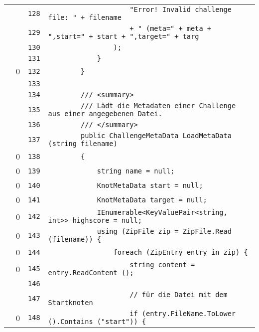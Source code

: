 \documentclass[a4paper,10pt]{article}
\begin{document}
\begin{longtable}[l]{lrrl}
\cellcolor{gray} &  & \verb~128~ & \verb~                    "Error! Invalid challenge file: " + filename~\\
\cellcolor{gray} &  & \verb~129~ & \verb~                    + " (meta=" + meta + ",start=" + start + ",target=" + targ~\\
\cellcolor{gray} &  & \verb~130~ & \verb~                );~\\
\cellcolor{gray} &  & \verb~131~ & \verb~            }~\\
\cellcolor{red} & 0 & \verb~132~ & \verb~        }~\\
\cellcolor{gray} &  & \verb~133~ & \verb~~\\
\cellcolor{gray} &  & \verb~134~ & \verb~        /// <summary>~\\
\cellcolor{gray} &  & \verb~135~ & \verb~        /// Lädt die Metadaten einer Challenge aus einer angegebenen Datei.~\\
\cellcolor{gray} &  & \verb~136~ & \verb~        /// </summary>~\\
\cellcolor{gray} &  & \verb~137~ & \verb~        public ChallengeMetaData LoadMetaData (string filename)~\\
\cellcolor{red} & 0 & \verb~138~ & \verb~        {~\\
\cellcolor{red} & 0 & \verb~139~ & \verb~            string name = null;~\\
\cellcolor{red} & 0 & \verb~140~ & \verb~            KnotMetaData start = null;~\\
\cellcolor{red} & 0 & \verb~141~ & \verb~            KnotMetaData target = null;~\\
\cellcolor{red} & 0 & \verb~142~ & \verb~            IEnumerable<KeyValuePair<string, int>> highscore = null;~\\
\cellcolor{red} & 0 & \verb~143~ & \verb~            using (ZipFile zip = ZipFile.Read (filename)) {~\\
\cellcolor{red} & 0 & \verb~144~ & \verb~                foreach (ZipEntry entry in zip) {~\\
\cellcolor{red} & 0 & \verb~145~ & \verb~                    string content = entry.ReadContent ();~\\
\cellcolor{gray} &  & \verb~146~ & \verb~~\\
\cellcolor{gray} &  & \verb~147~ & \verb~                    // für die Datei mit dem Startknoten~\\
\cellcolor{red} & 0 & \verb~148~ & \verb~                    if (entry.FileName.ToLower ().Contains ("start")) {~\\

\end{longtable}
\end{document}
